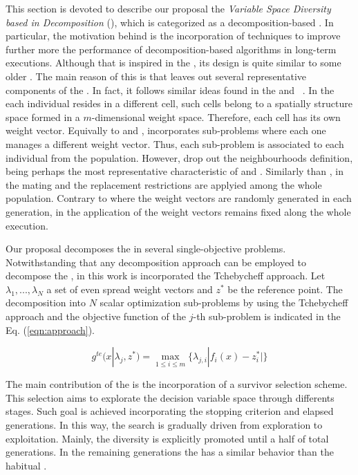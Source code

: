 This section is devoted to describe our proposal the \textit{Variable Space Diversity \MOEA{} based in Decomposition} (\VSDMOEAD{}), which is categorized as a decomposition-based \MOEA{}.
%
In particular, the motivation behind \VSDMOEAD{} is the incorporation of techniques to improve further more the performance of decomposition-based algorithms in long-term executions.
%
Although that \VSDMOEAD{} is inspired in the \MOEAD{}, its design is quite similar to some older \MOEAS{}.
%
The main reason of this is that \VSDMOEAD{} leaves out several representative components of the \MOEAD{}.
%
In fact, it follows similar ideas found in the \MOGA{} and \CMOGA{}~\cite{murata2002cellular}.
%
In the \CMOGA{} each individual resides in a different cell, such cells belong to a spatially structure space formed in a $m$-dimensional weight space.
%
Therefore, each cell has its own weight vector.
%
Equivally to \MOEAD{} and \CMOGA{}, \VSDMOEAD{} incorporates sub-problems where each one manages a different weight vector.
%
Thus, each sub-problem is associated to each individual from the population.
%
However, \VSDMOEAD{} drop out the neighbourhoods definition, being perhaps the most representative characteristic of \CMOGA{} and \MOEAD{}.
%
Similarly than \MOGA{}, in \VSDMOEAD{} the mating and the replacement restrictions are applyied among the whole population.
%
Contrary to \MOGA{} where the weight vectors are randomly generated in each generation, in \VSDMOEAD{} the application of the weight vectors remains fixed along the whole execution.
%

Our proposal decomposes the \MOP{} in several single-objective problems.
%
Notwithstanding that any decomposition approach can be employed to decompose the \MOP{}, in this work is incorporated the Tchebycheff approach.
%
Let $\lambda_1, ..., \lambda_N$ a set of even spread weight vectors and $z^*$ be the reference point.
%
The decomposition into $N$ scalar optimization sub-problems by using the Tchebycheff approach and the objective function of the $j$-th sub-problem is indicated in the Eq. (\ref{eqn:approach}).
%

\begin{equation}\label{eqn:approach}
\displaystyle{
g^{te}(x| \lambda_j, z^*) = \max_{ 1 \leq i \leq m} \{ \lambda_{j,i} | f_i(x) - z_i^*|\}
}
\end{equation}


The main contribution of the \VSDMOEAD{} is the incorporation of a survivor selection scheme.
%
This selection aims to explorate the decision variable space through differents stages.
%
Such goal is achieved incorporating the stopping criterion and elapsed generations.
%
In this way, the search is gradually driven from exploration to exploitation.
%
Mainly, the diversity is explicitly promoted until a half of total generations. 
%
In the remaining generations the \VSDMOEAD{} has a similar behavior than the habitual \MOEAS{}.
%

